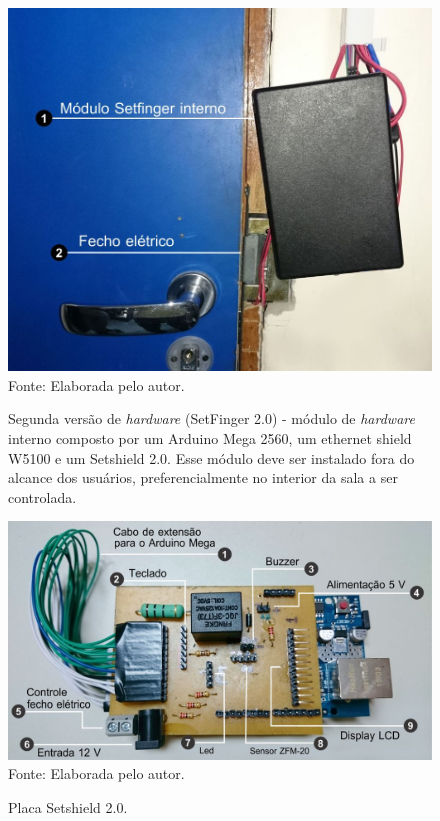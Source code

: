 \begin{figure}[!ht]
  \begin{center}
  \caption{Segunda versão de \textit{hardware} (SetFinger 2.0) - módulo de \textit{hardware} interno composto por um Arduino Mega 2560, um ethernet shield W5100 e um Setshield 2.0. Esse módulo deve ser instalado fora do alcance dos usuários, preferencialmente no interior da sala a ser controlada.}
  \includegraphics[scale=0.5]{figuras/cap4/setfinger_v2_p2.jpg}\\
  Fonte: Elaborada pelo autor.
  \label{setfinger_v2_p2}
  \end{center}
  \end{figure}
  

\begin{figure}[!ht]
  \begin{center}
  \caption{Placa Setshield 2.0.}
  \includegraphics[scale=0.55]{figuras/cap4/setshield_v2.jpg}\\
  Fonte: Elaborada pelo autor.
  \label{setshield_v2}
  \end{center}
  \end{figure}


